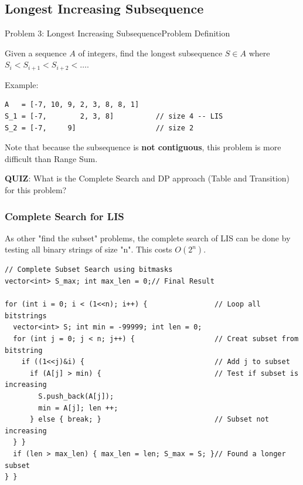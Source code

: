 \subsection{Longest Increasing Subsequence}

\begin{frame}[fragile]{Problem 3: Longest Increasing Subsequence}{Problem Definition}
  \begin{block}{}
    Given a sequence $A$ of integers, find the longest subsequence $S \in A$ where $S_i < S_{i+1} < S_{i+2} < \ldots$.
  \end{block}
  \bigskip

  Example:
\begin{verbatim}
A   = [-7, 10, 9, 2, 3, 8, 8, 1]
S_1 = [-7,        2, 3, 8]          // size 4 -- LIS
S_2 = [-7,     9]                   // size 2
\end{verbatim}
\bigskip

Note that because the subsequence is {\bf not contiguous}, this problem is more difficult than Range Sum.
\bigskip

{\bf QUIZ}: What is the \alert{Complete Search} and \alert{DP approach} (Table and Transition) for this problem?
\end{frame}

\begin{frame}[fragile]
  \frametitle{Complete Search for LIS}

  As other "find the subset" problems, the complete search of LIS can be done by testing all binary strings of size "n". This costs $O(2^n)$.
  \smallskip

  \begin{block}{}
    {\smaller
\begin{verbatim}
// Complete Subset Search using bitmasks
vector<int> S_max; int max_len = 0;// Final Result

for (int i = 0; i < (1<<n); i++) {                // Loop all bitstrings
  vector<int> S; int min = -99999; int len = 0;
  for (int j = 0; j < n; j++) {                   // Creat subset from bitstring
    if ((1<<j)&i) {                               // Add j to subset
      if (A[j] > min) {                           // Test if subset is increasing
        S.push_back(A[j]);
        min = A[j]; len ++;
      } else { break; }                           // Subset not increasing
  } }
  if (len > max_len) { max_len = len; S_max = S; }// Found a longer subset
} }
\end{verbatim}
    }
  \end{block}
\end{frame}

